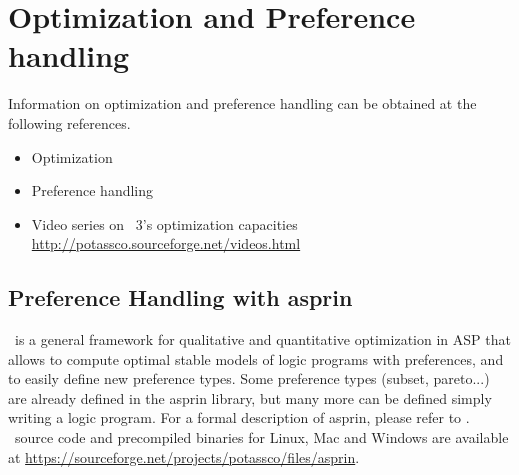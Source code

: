 
\section{Optimization and Preference handling}
\label{sec:prefopt}


Information on optimization and preference handling can be obtained at the following references.

\begin{itemize}
\item Optimization \cite{gekakasc11b,gekakasc11c,gekasc11b,ankamasc12a}
\item Preference handling \cite{brderosc14a,brderosc15a}
\item Video series on \clasp~3's optimization capacities \url{http://potassco.sourceforge.net/videos.html}
\end{itemize}

\subsection{Preference Handling with asprin}

\asprin\ is a general framework for qualitative and quantitative optimization in ASP
that allows to compute optimal stable models of logic programs with preferences, and     
to easily define new preference types.
Some preference types (subset, pareto...) are already defined in the asprin library, 
but many more can be defined  simply writing a logic program.  
For a formal description of asprin, please refer to \cite{brderosc15a}. 
\asprin\ source code and precompiled binaries for Linux, Mac and Windows are available  
at \url{https://sourceforge.net/projects/potassco/files/asprin}.  

% 
% 
% 

